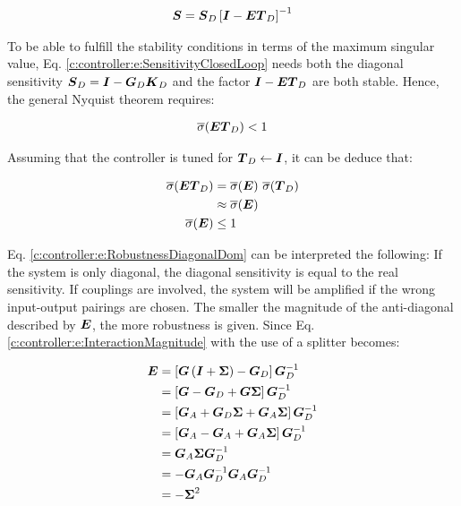 \begin{align}
\mbox{\boldmath$S$} = \mbox{\boldmath$S$}_D \left[\mbox{\boldmath$I$} - \mbox{\boldmath$E$} \mbox{\boldmath$T$}_D \right]^{-1}
\label{c:controller:e:SensitivityClosedLoop}
\end{align}

To be able to fulfill the stability conditions in terms of the maximum singular value, Eq. \ref{c:controller:e:SensitivityClosedLoop} needs both the diagonal sensitivity $\mbox{\boldmath$S$}_D =  \mbox{\boldmath$I$} - \mbox{\boldmath$G$}_D \mbox{\boldmath$K$}_D$ and the factor $\mbox{\boldmath$I$} - \mbox{\boldmath$E$} \mbox{\boldmath$T$}_D$ are both stable. Hence, the general Nyquist theorem requires:

\begin{align}
\overline{\sigma}(\mbox{\boldmath$E$}\mbox{\boldmath$T$}_D) < 1
\end{align}

Assuming that the controller is tuned for $\mbox{\boldmath$T$}_D \leftarrow \mbox{\boldmath$I$}$, it can be deduce that:

\begin{align}
\begin{split}
\overline{\sigma}(\mbox{\boldmath$E$}\mbox{\boldmath$T$}_D) &= \overline{\sigma}(\mbox{\boldmath$E$})~\overline{\sigma}(\mbox{\boldmath$T$}_D) \\
&\approx \overline{\sigma}(\mbox{\boldmath$E$}) \\
\overline{\sigma}(\mbox{\boldmath$E$}) &\leq 1
\end{split}
\label{c:controller:e:RobustnessDiagonalDom}
\end{align}

Eq. \ref{c:controller:e:RobustnessDiagonalDom} can be interpreted the following: If the system is only diagonal, the diagonal sensitivity is equal to the real sensitivity. If couplings are involved, the system will be amplified if the wrong input-output pairings are chosen. The smaller the magnitude of the anti-diagonal described by $\mbox{\boldmath$E$}$, the more robustness is given. Since Eq.\ref{c:controller:e:InteractionMagnitude} with the use of a splitter becomes:

\begin{align}
\begin{split}
\mbox{\boldmath$E$} &= \left[ \mbox{\boldmath$G$} \left(\mbox{\boldmath$I$}+\mbox{\boldmath$\Sigma$}\right)- \mbox{\boldmath$G$}_D \right]\mbox{\boldmath$G$}_D^{-1} \\
&= \left[\mbox{\boldmath$G$}-\mbox{\boldmath$G$}_D + \mbox{\boldmath$G$}\mbox{\boldmath$\Sigma$}\right]\mbox{\boldmath$G$}_D^{-1} \\
&= \left[\mbox{\boldmath$G$}_A + \mbox{\boldmath$G$}_D \mbox{\boldmath$\Sigma$}+\mbox{\boldmath$G$}_A \mbox{\boldmath$\Sigma$}\right]\mbox{\boldmath$G$}_D^{-1} \\
&= \left[\mbox{\boldmath$G$}_A - \mbox{\boldmath$G$}_A +\mbox{\boldmath$G$}_A \mbox{\boldmath$\Sigma$}\right]\mbox{\boldmath$G$}_D^{-1} \\
&= \mbox{\boldmath$G$}_A \mbox{\boldmath$\Sigma$}\mbox{\boldmath$G$}_D^{-1} \\
&= -\mbox{\boldmath$G$}_A\mbox{\boldmath$G$}_D^{-1}\mbox{\boldmath$G$}_A\mbox{\boldmath$G$}_D^{-1} \\
&= - \mbox{\boldmath$\Sigma$}^2
\end{split}
\label{c:controller:SplitterMagnitude}
\end{align}

